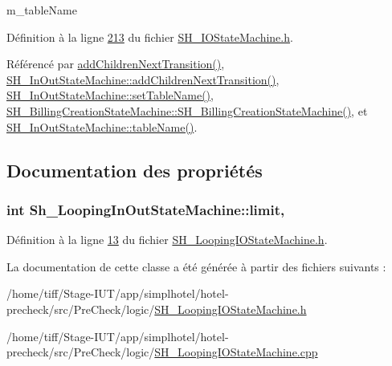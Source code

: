 m\-\_\-table\-Name 



Définition à la ligne \hyperlink{SH__IOStateMachine_8h_source_l00213}{213} du fichier \hyperlink{SH__IOStateMachine_8h_source}{S\-H\-\_\-\-I\-O\-State\-Machine.\-h}.



Référencé par \hyperlink{classSh__LoopingInOutStateMachine_acfd8d0711c793b13c759f6c50be6a315}{add\-Children\-Next\-Transition()}, \hyperlink{classSH__InOutStateMachine_a689e5513ef6ef3fc1598efacd413372e}{S\-H\-\_\-\-In\-Out\-State\-Machine\-::add\-Children\-Next\-Transition()}, \hyperlink{classSH__InOutStateMachine_a437a730d07ddd15bd96314ab0b6cf40e}{S\-H\-\_\-\-In\-Out\-State\-Machine\-::set\-Table\-Name()}, \hyperlink{classSH__BillingCreationStateMachine_ad62b77fa4aeafe200056ff3974562f83}{S\-H\-\_\-\-Billing\-Creation\-State\-Machine\-::\-S\-H\-\_\-\-Billing\-Creation\-State\-Machine()}, et \hyperlink{classSH__InOutStateMachine_a18b07a985695100612bbcbda870933b4}{S\-H\-\_\-\-In\-Out\-State\-Machine\-::table\-Name()}.



\subsection{Documentation des propriétés}
\hypertarget{classSh__LoopingInOutStateMachine_aea47cac4b5f895ba85604cdce1160ccd}{
\subsubsection[{limit}]{\setlength{\rightskip}{0pt plus 5cm}int Sh\-\_\-\-Looping\-In\-Out\-State\-Machine\-::limit\hspace{0.3cm}{\ttfamily [read]}, {\ttfamily [write]}}}\label{classSh__LoopingInOutStateMachine_aea47cac4b5f895ba85604cdce1160ccd}


Définition à la ligne \hyperlink{SH__LoopingIOStateMachine_8h_source_l00013}{13} du fichier \hyperlink{SH__LoopingIOStateMachine_8h_source}{S\-H\-\_\-\-Looping\-I\-O\-State\-Machine.\-h}.



La documentation de cette classe a été générée à partir des fichiers suivants \-:\begin{DoxyCompactItemize}
\item 
/home/tiff/\-Stage-\/\-I\-U\-T/app/simplhotel/hotel-\/precheck/src/\-Pre\-Check/logic/\hyperlink{SH__LoopingIOStateMachine_8h}{S\-H\-\_\-\-Looping\-I\-O\-State\-Machine.\-h}\item 
/home/tiff/\-Stage-\/\-I\-U\-T/app/simplhotel/hotel-\/precheck/src/\-Pre\-Check/logic/\hyperlink{SH__LoopingIOStateMachine_8cpp}{S\-H\-\_\-\-Looping\-I\-O\-State\-Machine.\-cpp}\end{DoxyCompactItemize}
